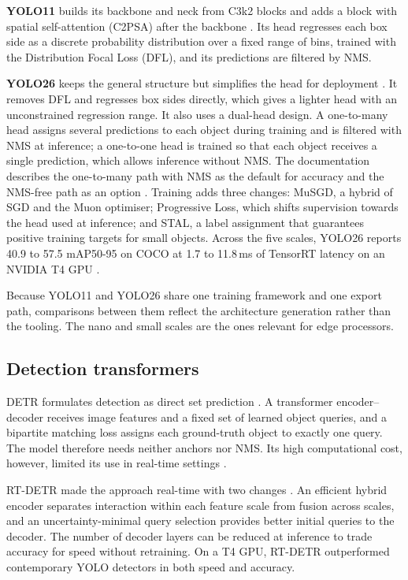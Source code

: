 \documentclass[a4paper,11pt,twoside]{report}
\theoremstyle{definition}
\begin{document}
\textbf{YOLO11} builds its backbone and neck from C3k2 blocks and adds a block with spatial self-attention (C2PSA) after the backbone \cite{UltralyticsYOLO11, Sapkota2025YOLOEvolution}. Its head regresses each box side as a discrete probability distribution over a fixed range of bins, trained with the Distribution Focal Loss (DFL), and its predictions are filtered by NMS.

\textbf{YOLO26} keeps the general structure but simplifies the head for deployment \cite{Jocher2026YOLO26}. It removes DFL and regresses box sides directly, which gives a lighter head with an unconstrained regression range. It also uses a dual-head design. A one-to-many head assigns several predictions to each object during training and is filtered with NMS at inference; a one-to-one head is trained so that each object receives a single prediction, which allows inference without NMS. The documentation describes the one-to-many path with NMS as the default for accuracy and the NMS-free path as an option \cite{UltralyticsYOLO26}. Training adds three changes: MuSGD, a hybrid of SGD and the Muon optimiser; Progressive Loss, which shifts supervision towards the head used at inference; and STAL, a label assignment that guarantees positive training targets for small objects. Across the five scales, YOLO26 reports 40.9 to 57.5 mAP50-95 on COCO at 1.7 to 11.8\,ms of TensorRT latency on an NVIDIA T4 GPU \cite{Jocher2026YOLO26}.

Because YOLO11 and YOLO26 share one training framework and one export path, comparisons between them reflect the architecture generation rather than the tooling. The nano and small scales are the ones relevant for edge processors.

\subsection{Detection transformers}
\label{sec:rw_detr}

DETR formulates detection as direct set prediction \cite{Carion2020DETR}. A transformer encoder--decoder receives image features and a fixed set of learned object queries, and a bipartite matching loss assigns each ground-truth object to exactly one query. The model therefore needs neither anchors nor NMS. Its high computational cost, however, limited its use in real-time settings \cite{Zhao2024RTDETR}.

RT-DETR made the approach real-time with two changes \cite{Zhao2024RTDETR}. An efficient hybrid encoder separates interaction within each feature scale from fusion across scales, and an uncertainty-minimal query selection provides better initial queries to the decoder. The number of decoder layers can be reduced at inference to trade accuracy for speed without retraining. On a T4 GPU, RT-DETR outperformed contemporary YOLO detectors in both speed and accuracy.
\end{document}
